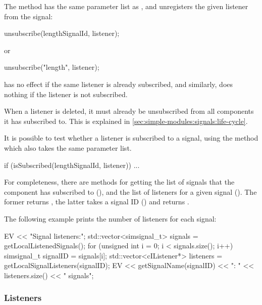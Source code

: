 The  method has the same parameter list
as , and unregisters the given listener
from the signal:

\begin{cpp}
unsubscribe(lengthSignalId, listener);
\end{cpp}

or

\begin{cpp}
unsubscribe("length", listener);
\end{cpp}

 has no effect if the same listener is already
subscribed, and similarly,  does nothing
if the listener is not subscribed.

\begin{note}
  When a listener is deleted, it must already be unsubscribed from
  all components it has subscribed to. This is explained in
  \ref{sec:simple-modules:signals:life-cycle}.
\end{note}

It is possible to test whether a listener is subscribed to a signal,
using the  method which also takes the same
parameter list.

\begin{cpp}
if (isSubscribed(lengthSignalId, listener))
{
    ...
}
\end{cpp}

For completeness, there are methods for getting the list of signals
that the component has subscribed to (),
and the list of listeners for a given signal ().
The former returns , the latter takes
a signal ID () and returns .

The following example prints the number of listeners for each signal:

\begin{cpp}
EV << "Signal listeners:\n";
std::vector<simsignal_t> signals = getLocalListenedSignals();
for (unsigned int i = 0; i < signals.size(); i++) {
    simsignal_t signalID = signals[i];
    std::vector<cIListener*> listeners = getLocalSignalListeners(signalID);
    EV << getSignalName(signalID) << ": " << listeners.size() << " signals\n";
}
\end{cpp}

\subsubsection{Listeners}

